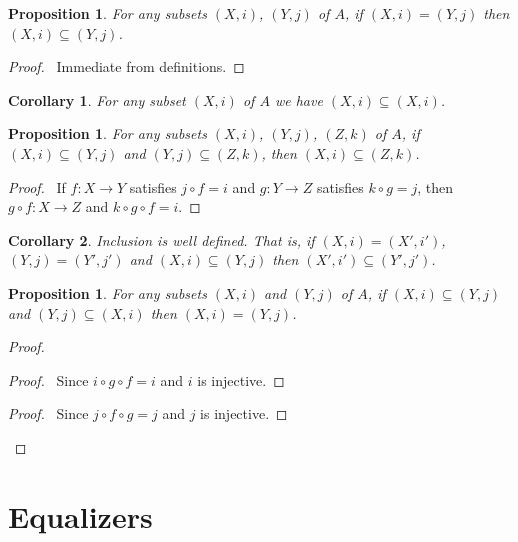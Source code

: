 \documentclass{book}
\let\qed\relax
\newtheorem{prop}[ax]{Proposition}
\newtheorem{cor}{Corollary}[ax]
\theoremstyle{definition}
\newcommand{\id}[1]{\ensuremath{\mathrm{id}_{#1}}}
\begin{document}
\begin{prop}
For any subsets $(X,i)$, $(Y,j)$ of $A$, if $(X,i) = (Y,j)$ then $(X,i) \subseteq (Y,j)$.
\end{prop}

\begin{proof}
\pf\ Immediate from definitions. \qed
\end{proof}

\begin{cor}
For any subset $(X,i)$ of $A$ we have $(X,i) \subseteq (X,i)$.
\end{cor}

\begin{prop}
For any subsets $(X,i)$, $(Y,j)$, $(Z,k)$ of $A$, if $(X,i) \subseteq (Y,j)$ and $(Y,j) \subseteq (Z,k)$, then $(X,i) \subseteq (Z,k)$.
\end{prop}

\begin{proof}
\pf\ If $f : X \rightarrow Y$ satisfies $j \circ f = i$ and $g : Y \rightarrow Z$ satisfies $k \circ g = j$, then $g \circ f : X \rightarrow Z$ and $k \circ g \circ f = i$. \qed
\end{proof}

\begin{cor}
Inclusion is well defined. That is, if $(X,i) = (X',i')$, $(Y,j) = (Y',j')$ and $(X,i) \subseteq (Y,j)$ then $(X',i') \subseteq (Y',j')$.
\end{cor}

\begin{prop}
For any subsets $(X,i)$ and $(Y,j)$ of $A$, if $(X,i) \subseteq (Y,j)$ and $(Y,j) \subseteq (X,i)$ then $(X,i) = (Y,j)$.
\end{prop}

\begin{proof}
\pf
{}
\step{3}{$g \circ f = \id{X}$}
\begin{proof}
	\pf\ Since $i \circ g \circ f = i$ and $i$ is injective.
\end{proof}
\step{4}{$f \circ g = \id{Y}$}
\begin{proof}
	\pf\ Since $j \circ f \circ g = j$ and $j$ is injective.
\end{proof}
\qed
\end{proof}

\section{Equalizers}
\end{document}
